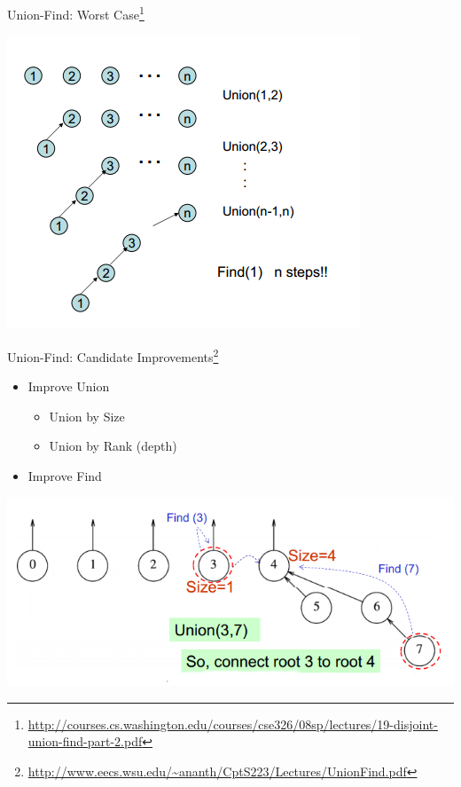 \documentclass{beamer}
\begin{document}
\begin{frame}{Union-Find: Worst Case\footnote{\url{http://courses.cs.washington.edu/courses/cse326/08sp/lectures/19-disjoint-union-find-part-2.pdf}} }
    \begin{center}
        \includegraphics[scale=0.5]{unionFindWorstCase.png} 
    \end{center}
\end{frame}


\begin{frame}{Union-Find: Candidate Improvements\footnote{\url{http://www.eecs.wsu.edu/~ananth/CptS223/Lectures/UnionFind.pdf}}}
    \begin{itemize}
        \item Improve Union
        \begin{itemize}
            \item Union by Size
            \item Union by Rank (depth)
        \end{itemize}
        \item Improve Find
    \end{itemize}
    \begin{center}
        \includegraphics[scale=0.4]{unionFindEg.png}
    \end{center}
\end{frame}
\end{document}

